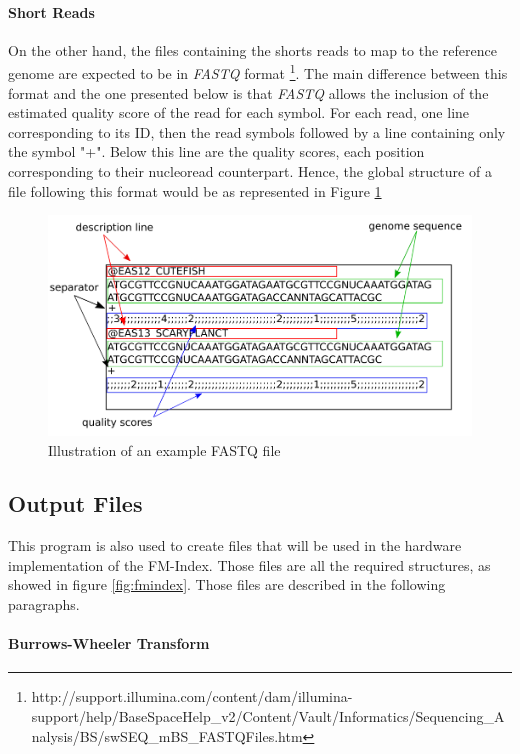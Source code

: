 \paragraph{Short Reads}
On the other hand, the files containing the shorts reads to map to the reference genome are expected to be in \textsl{FASTQ} format \footnote{http://support.illumina.com/content/dam/illumina-support/help/BaseSpaceHelp_v2/Content/Vault/Informatics/Sequencing_Analysis/BS/swSEQ_mBS_FASTQFiles.htm}. The main difference between this format and the one presented below is that \textsl{FASTQ} allows the inclusion of the estimated quality score of the read for each symbol. For each read, one line corresponding to its ID, then the read symbols followed by a line containing only the symbol "+". Below this line are the quality scores, each position corresponding to their nucleoread counterpart. Hence, the global structure of a file following this format would be as represented in Figure \ref{fig:fastq}


\begin{figure}[H]
    \centering
    \includegraphics[scale = 0.35]{Figures/fastqex.png}
    \caption{Illustration of an example FASTQ file }
    \label{fig:fastq}
\end{figure}

\subsection{Output Files}

This program is also used to create files that will be used in the hardware implementation of the FM-Index. Those files are all the required structures, as showed in figure \ref{fig:fmindex}. Those files are described in the following paragraphs. 

\paragraph{Burrows-Wheeler Transform}

